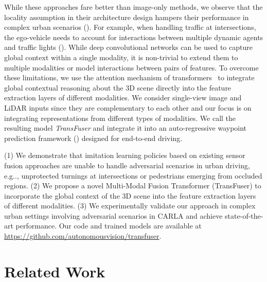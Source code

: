 \documentclass[final]{cvpr}
\makeatletter
\DeclareRobustCommand\onedot{\futurelet\@let@token\@onedot}
\def\@onedot{\ifx\@let@token.\else.\null\fi\xspace}
\def\eg{e.g\onedot} \def\Eg{E.g\onedot}
\newcommand{\boldparagraph}[1]{\vspace{0.1cm}\noindent{\bf #1:}}
\makeatother
\begin{document}
While these approaches fare better than image-only methods, we observe that the locality assumption in their architecture design hampers their performance in complex urban scenarios (). For example, when handling traffic at intersections, the ego-vehicle needs to account for interactions between multiple dynamic agents and traffic lights (). While deep convolutional networks can be used to capture global context within a single modality, it is non-trivial to extend them to multiple modalities or model interactions between pairs of features. To overcome these limitations, we use the attention mechanism of transformers~\cite{Vaswani2017NEURIPS} to integrate global contextual reasoning about the 3D scene directly into the feature extraction layers of different modalities. We consider single-view image and LiDAR inputs since they are complementary to each other and our focus is on integrating representations from different types of modalities. We call the resulting model \emph{TransFuser} and integrate it into an auto-regressive waypoint prediction framework () designed for end-to-end driving.

\boldparagraph{Contributions} (1) We demonstrate that imitation learning policies based on existing sensor fusion approaches are unable to handle adversarial scenarios in urban driving, \eg, unprotected turnings at intersections or pedestrians emerging from occluded regions. (2) We propose a novel Multi-Modal Fusion Transformer (TransFuser) to incorporate the global context of the 3D scene into the feature extraction layers of different modalities. (3) We experimentally validate our approach in complex urban settings involving adversarial scenarios in CARLA and achieve state-of-the-art performance. Our code and trained models are available at \url{https://github.com/autonomousvision/transfuser}.
 \section{Related Work}
\label{sec:related}
\end{document}
